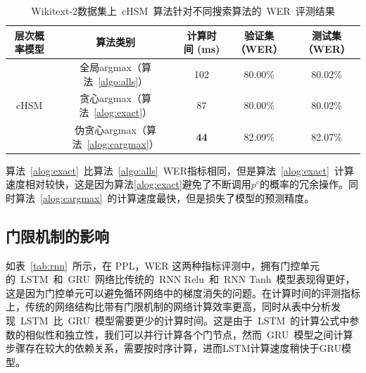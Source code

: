 \begin{table}[!ht]
  \centering
  \caption{Wikitext-2数据集上~cHSM~算法针对不同搜索算法的~WER~评测结果\label{tab:search}}
\begin{tabular}{ccccc}
  \toprule
  层次概率模型 & 算法类别&计算时间 (ms)&验证集（WER）& 测试集（WER）\\ \midrule
  \multirow{3}{*}{cHSM} &全局argmax（算法~\ref{algo:alls}）&102& 80.00\%& 80.02\%\\
        &贪心argmax（算法~\ref{alog:exact}）&87& 80.00\%& 80.02\%\\
        &伪贪心argmax（算法~\ref{alog:cargmax}）&\textbf{44}& 82.09\%&  82.07\%\\
  \bottomrule
\end{tabular}
\end{table}


算法~\ref{alog:exact}~比算法~\ref{algo:alls}~WER指标相同，但是算法~\ref{alog:exact}~计算速度相对较快，这是因为算法\ref{alog:exact}避免了不断调用$p^c$的概率的冗余操作。同时算法~\ref{alog:cargmax}~的计算速度最快，但是损失了模型的预测精度。


\subsection{门限机制的影响}

如表~\ref{tab:rnn}~所示，在 PPL，WER 这两种指标评测中，拥有门控单元的~LSTM~和~GRU~网络比传统的~RNN Relu~和~RNN Tanh~模型表现得更好，这是因为门控单元可以避免循环网络中的梯度消失的问题。在计算时间的评测指标上，传统的网络结构比带有门限机制的网络计算效率更高，同时从表中分析发现~LSTM~比~GRU~模型需要更少的计算时间。这是由于~LSTM~的计算公式中参数的相似性和独立性，我们可以并行计算各个门节点，然而~GRU~模型之间计算步骤存在较大的依赖关系，需要按时序计算，进而LSTM计算速度稍快于GRU模型。

